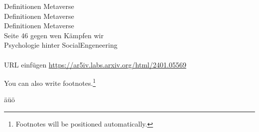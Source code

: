 Definitionen Metaverse \cite{Ball22}
\\Definitionen Metaverse \cite{Ball22a}
\\Definitionen Metaverse \cite{Drip22} \\
Seite 46 gegen wen Kämpfen wir \cite{Hypp22}\\
Psychologie hinter SocialEngeneering \cite{schu11}\\
\\

URL einfügen \url{https://ar5iv.labs.arxiv.org/html/2401.05569}


You can also write footnotes.\footnote{Footnotes will be positioned automatically.}

äüö
